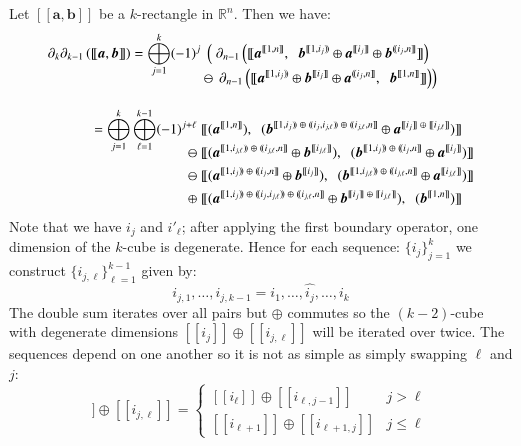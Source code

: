Let $[\![\boldsymbol{a}, \boldsymbol{b}]\!]$ be a $k$-rectangle in $\mathbb{R}^n$.
Then we have:
\begin{align*}
	\partial_k \partial_{k-1} \left( [\![ \boldsymbol{a}, \boldsymbol{b} ]\!] \right) 
	= \bigoplus_{j=1}^k (-1)^j 
		& \;  \left( \; \partial_{n-1} \left(	
			[\![ 	\boldsymbol{a}^{[\![1,n]\!]}, \;\;
				\boldsymbol{b}^{[\![1,i_j)\!)}
					\oplus \boldsymbol{a}^{[\![i_j]\!]}
					\oplus \boldsymbol{b}^{(\!(i_j,n]\!]} 
			]\!] 
		\right) \right. \notag\\[-1em]
		& \ominus \; \left. \! \partial_{n-1} \left(
			[\![ 	\boldsymbol{a}^{[\![1,i_j)\!)}
					\oplus \boldsymbol{b}^{[\![i_j]\!]}
					\oplus \boldsymbol{a}^{(\!(i_j,n]\!]} , \;\;
				\boldsymbol{b}^{[\![1,n]\!]}
			]\!] 
		\right)\right) \\[1em]
	= \bigoplus_{j=1}^k \bigoplus_{\ell=1}^{k-1} (-1)^{j+\ell}
		\;&
			[\![ 	(\boldsymbol{a}^{[\![1,n]\!]}), \;\;
				(\boldsymbol{b}^{[\![1,i_j)\!) \;\oplus\; (\!(i_j,i_{j,\ell})\!) \;\oplus\; (\!(i_{j,\ell},n]\!]}
					\oplus \boldsymbol{a}^{[\![i_j]\!] \;\oplus\; [\![i_{j,\ell}]\!]})
			]\!] \notag\\[-1em]
		\ominus \;&
			[\![ 	(\boldsymbol{a}^{[\![1,i_{j,\ell})\!) \;\oplus\; (\!(i_{j,\ell},n]\!]}
					\oplus \boldsymbol{b}^{[\![i_{j,\ell}]\!]}), \;\;
				(\boldsymbol{b}^{[\![1,i_j)\!) \;\oplus\; (\!(i_j,n]\!]}
					\oplus \boldsymbol{a}^{[\![i_j]\!]})
			]\!] \notag\\
		\ominus \; &
			[\![ 	(\boldsymbol{a}^{[\![1,i_j)\!) \;\oplus\; (\!(i_j,n]\!]}
					\oplus \boldsymbol{b}^{[\![i_j]\!]}), \;\;
				(\boldsymbol{b}^{[\![1,i_{j,\ell})\!) \;\oplus\; (\!(i_{j,\ell},n]\!]}
					\oplus \boldsymbol{a}^{[\![i_{j,\ell}]\!]})
			]\!] \notag\\
		\oplus \;&
			[\![ 	(\boldsymbol{a}^{[\![1,i_j)\!) \;\oplus\; (\!(i_j,i_{j,\ell})\!) \;\oplus\; (\!(i_{j,\ell},n]\!]}
					\oplus \boldsymbol{b}^{[\![i_j]\!] \;\oplus\; [\![i_{j,\ell}]\!]}), \;\;
				(\boldsymbol{b}^{[\![1,n]\!]})
			]\!] 
\end{align*}
Note that we have $i_j$ and $i'_\ell$; after applying the first boundary operator, one dimension of the $k$-cube is degenerate.
Hence for each sequence: $\{i_j\}_{j=1}^k$ we construct $\{i_{j,\ell}\}_{\ell=1}^{k-1}$ given by:
\begin{equation*}
	i_{j,1} , \ldots, i_{j,k-1} = i_1, \ldots, \widehat{i_j}, \ldots, i_k
\end{equation*}
The double sum iterates over all pairs but $\oplus$ commutes so the $(k-2)$-cube with degenerate dimensions $[\![i_j]\!] \oplus [\![i_{j,\ell}]\!]$ will be iterated over twice. 
The sequences depend on one another so it is not as simple as simply swapping $\ell$ and $j$:
\begin{equation*}
   [\![i_j]\!] \oplus [\![i_{j,\ell}]\!] =
     \begin{cases}
       [\![i_\ell]\!] \oplus [\![i_{\ell,j-1}]\!] & j > \ell \\
       [\![i_{\ell+1}]\!] \oplus [\![i_{\ell+1,j}]\!] & j \leq \ell
     \end{cases}
\end{equation*}


